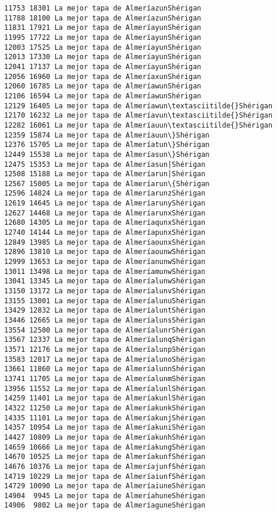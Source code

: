\documentclass[11pt]{article}
\begin{document}
\begin{Verbatim}[commandchars=\\\{\}]
11753 18301 La mejor tapa de AlmeríazunShérigan
11788 18100 La mejor tapa de AlmeríazunShérigan
11831 17921 La mejor tapa de AlmeríayunShérigan
11995 17722 La mejor tapa de AlmeríayunShérigan
12003 17525 La mejor tapa de AlmeríayunShérigan
12013 17330 La mejor tapa de AlmeríayunShérigan
12041 17137 La mejor tapa de AlmeríayunShérigan
12056 16960 La mejor tapa de AlmeríaxunShérigan
12060 16785 La mejor tapa de AlmeríawunShérigan
12106 16594 La mejor tapa de AlmeríawunShérigan
12129 16405 La mejor tapa de Almeríawun\textasciitilde{}Shérigan
12170 16232 La mejor tapa de Almeríavun\textasciitilde{}Shérigan
12282 16061 La mejor tapa de Almeríauun\textasciitilde{}Shérigan
12359 15874 La mejor tapa de Almeríauun\}Shérigan
12376 15705 La mejor tapa de Almeríatun\}Shérigan
12449 15538 La mejor tapa de Almeríasun\}Shérigan
12475 15353 La mejor tapa de Almeríasun|Shérigan
12508 15188 La mejor tapa de Almeríarun|Shérigan
12567 15005 La mejor tapa de Almeríarun\{Shérigan
12596 14824 La mejor tapa de AlmeríarunzShérigan
12619 14645 La mejor tapa de AlmeríarunyShérigan
12627 14468 La mejor tapa de AlmeríarunxShérigan
12680 14305 La mejor tapa de AlmeríaqunxShérigan
12740 14144 La mejor tapa de AlmeríapunxShérigan
12849 13985 La mejor tapa de AlmeríaounxShérigan
12896 13810 La mejor tapa de AlmeríaounwShérigan
12999 13653 La mejor tapa de AlmeríanunwShérigan
13011 13498 La mejor tapa de AlmeríamunwShérigan
13041 13345 La mejor tapa de AlmeríalunwShérigan
13150 13172 La mejor tapa de AlmeríalunvShérigan
13155 13001 La mejor tapa de AlmeríalunuShérigan
13429 12832 La mejor tapa de AlmeríaluntShérigan
13446 12665 La mejor tapa de AlmeríalunsShérigan
13554 12500 La mejor tapa de AlmeríalunrShérigan
13567 12337 La mejor tapa de AlmeríalunqShérigan
13571 12176 La mejor tapa de AlmeríalunpShérigan
13583 12017 La mejor tapa de AlmeríalunoShérigan
13661 11860 La mejor tapa de AlmeríalunnShérigan
13741 11705 La mejor tapa de AlmeríalunmShérigan
13956 11552 La mejor tapa de AlmeríalunlShérigan
14259 11401 La mejor tapa de AlmeríakunlShérigan
14322 11250 La mejor tapa de AlmeríakunkShérigan
14335 11101 La mejor tapa de AlmeríakunjShérigan
14357 10954 La mejor tapa de AlmeríakuniShérigan
14427 10809 La mejor tapa de AlmeríakunhShérigan
14659 10666 La mejor tapa de AlmeríakungShérigan
14670 10525 La mejor tapa de AlmeríakunfShérigan
14676 10376 La mejor tapa de AlmeríajunfShérigan
14719 10229 La mejor tapa de AlmeríaiunfShérigan
14729 10090 La mejor tapa de AlmeríaiuneShérigan
14904  9945 La mejor tapa de AlmeríahuneShérigan
14906  9802 La mejor tapa de AlmeríaguneShérigan

\end{Verbatim}
\end{document}
